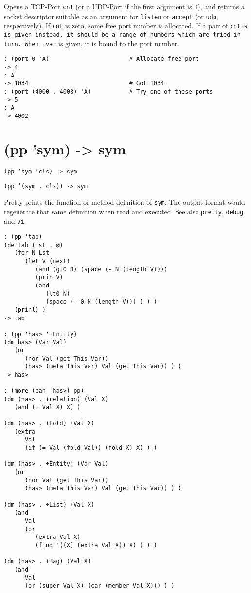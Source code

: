 {{{{{{{Opens a TCP-Port \texttt{cnt} (or a UDP-Port if the first argument is \texttt{T}), and
returns a socket descriptor suitable as an argument for \texttt{listen} or
\texttt{accept} (or \texttt{udp}, respectively). If \texttt{cnt} is zero, some free port
number is allocated. If a pair of \texttt{cnt=s is given instead, it should be a range of numbers which are tried in turn. When =var} is given, it is
bound to the port number.


\begin{verbatim}
: (port 0 'A)                       # Allocate free port
-> 4
: A
-> 1034                             # Got 1034
: (port (4000 . 4008) 'A)           # Try one of these ports
-> 5
: A
-> 4002
\end{verbatim}

 
\section{(pp 'sym) -> sym}
\label{sec-8-1-16-24}


\texttt{(pp 'sym 'cls) -> sym}

\texttt{(pp '(sym . cls)) -> sym}

Pretty-prints the function or method definition of \texttt{sym}. The output
format would regenerate that same definition when read and executed. See
also \texttt{pretty}, \texttt{debug} and \texttt{vi}.


\begin{verbatim}
: (pp 'tab)
(de tab (Lst . @)
   (for N Lst
      (let V (next)
         (and (gt0 N) (space (- N (length V))))
         (prin V)
         (and
            (lt0 N)
            (space (- 0 N (length V))) ) ) )
   (prinl) )
-> tab

: (pp 'has> '+Entity)
(dm has> (Var Val)
   (or
      (nor Val (get This Var))
      (has> (meta This Var) Val (get This Var)) ) )
-> has>

: (more (can 'has>) pp)
(dm (has> . +relation) (Val X)
   (and (= Val X) X) )

(dm (has> . +Fold) (Val X)
   (extra
      Val
      (if (= Val (fold Val)) (fold X) X) ) )

(dm (has> . +Entity) (Var Val)
   (or
      (nor Val (get This Var))
      (has> (meta This Var) Val (get This Var)) ) )

(dm (has> . +List) (Val X)
   (and
      Val
      (or
         (extra Val X)
         (find '((X) (extra Val X)) X) ) ) )

(dm (has> . +Bag) (Val X)
   (and
      Val
      (or (super Val X) (car (member Val X))) ) )
\end{verbatim}

}}}}}}}
